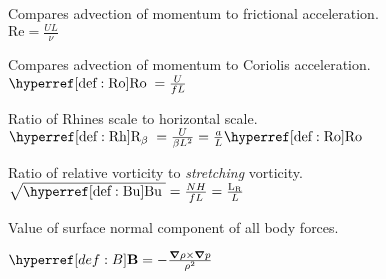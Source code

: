 \begin{fullwidth}
\begin{multicols}{2}
\begin{definition} \label{def:Re}
Compares advection of momentum to frictional acceleration.\\
$\mathrm{Re} = \frac{U L}{\nu}$
 \end{definition}
\begin{definition} \label{def:Ro}
Compares advection of momentum to Coriolis acceleration.\\
$\Ro = \frac{U }{f L}$
 \end{definition}
\begin{definition}\label{def:Rh}
Ratio of Rhines scale to horizontal scale.\\
$\Rh = \frac{U }{\beta L^2} = \frac{a}{L} \Ro$
  \end{definition}
\begin{definition}\label{def:Bu}
Ratio of relative vorticity to \textit{stretching} vorticity.\\
$\sqrt{\Bu}=\frac{N H}{f L}=\frac{\mathrm{L_R}}{L}$
 \end{definition}
\begin{definition} \label{def:m}
\end{definition}
\begin{definition} \label{def:g}
Value of surface normal component of all body forces.
\end{definition}
\begin{definition} \label{def:vort}
\end{definition}
\begin{definition} \label{def:B }
$\B= -\frac{ \grad \rho 	\times \grad p}{ \rho^{2}} $
\end{definition}
\begin{definition} \label{def:E_k}
\end{definition}

\end{multicols}
\end{fullwidth}
